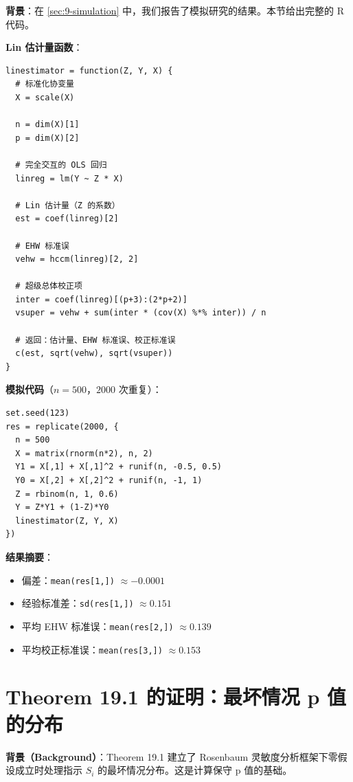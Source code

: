 \textbf{背景}：在 \cref{sec:9-simulation} 中，我们报告了模拟研究的结果。本节给出完整的 R 代码。

\textbf{Lin 估计量函数}：

\ttfamily
\begin{verbatim}
linestimator = function(Z, Y, X) {
  # 标准化协变量
  X = scale(X)

  n = dim(X)[1]
  p = dim(X)[2]

  # 完全交互的 OLS 回归
  linreg = lm(Y ~ Z * X)

  # Lin 估计量（Z 的系数）
  est = coef(linreg)[2]

  # EHW 标准误
  vehw = hccm(linreg)[2, 2]

  # 超级总体校正项
  inter = coef(linreg)[(p+3):(2*p+2)]
  vsuper = vehw + sum(inter * (cov(X) %*% inter)) / n

  # 返回：估计量、EHW 标准误、校正标准误
  c(est, sqrt(vehw), sqrt(vsuper))
}
\end{verbatim}
\rmfamily

\textbf{模拟代码}（$n=500$，$2000$ 次重复）：

\ttfamily
\begin{verbatim}
set.seed(123)
res = replicate(2000, {
  n = 500
  X = matrix(rnorm(n*2), n, 2)
  Y1 = X[,1] + X[,1]^2 + runif(n, -0.5, 0.5)
  Y0 = X[,2] + X[,2]^2 + runif(n, -1, 1)
  Z = rbinom(n, 1, 0.6)
  Y = Z*Y1 + (1-Z)*Y0
  linestimator(Z, Y, X)
})
\end{verbatim}
\rmfamily

\textbf{结果摘要}：

\begin{itemize}
  \item 偏差：\texttt{mean(res[1,])} $\approx -0.0001$
  \item 经验标准差：\texttt{sd(res[1,])} $\approx 0.151$
  \item 平均 EHW 标准误：\texttt{mean(res[2,])} $\approx 0.139$
  \item 平均校正标准误：\texttt{mean(res[3,])} $\approx 0.153$
\end{itemize}

\section{Theorem 19.1 的证明：最坏情况 p 值的分布}\label{sec:appendix-19-worst-case-proof}

\textbf{背景（Background）}：Theorem 19.1 建立了 Rosenbaum 灵敏度分析框架下零假设成立时处理指示 $S_i$ 的最坏情况分布。这是计算保守 p 值的基础。

